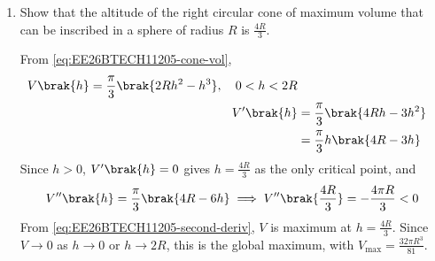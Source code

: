\begin{enumerate}[label=\thesubsection.\arabic*, ref=\thesubsection.\theenumi, itemsep=3ex]
\medskip
\solution From \eqref{eq:EE26BTECH11205-inv-prod}, $\brak{\vec{A}\vec{B}}^{-1} = \vec{B}^{-1}\vec{A}^{-1}$. Here $\mydet{\vec{B}} = 1\brak{3} - 2\brak{-1} - 2\brak{2} = 1$ and, from \eqref{eq:EE26BTECH11205-adjugate}, the matrix of cofactors is
\begin{align}
	\vec{C} &= \myvec{3 & 1 & 2 \\ 2 & 1 & 2 \\ 6 & 2 & 5} \notag
	\\
	\implies \vec{B}^{-1} &= \vec{C}^{\top} \notag
	\\
	&= \myvec{3 & 2 & 6 \\ 1 & 1 & 2 \\ 2 & 2 & 5}
\end{align}
Therefore
\begin{align}
	\brak{\vec{A}\vec{B}}^{-1} &= \myvec{3 & 2 & 6 \\ 1 & 1 & 2 \\ 2 & 2 & 5}\myvec{3 & -1 & 1 \\ -15 & 6 & -5 \\ 5 & -2 & 2} \notag
	\\
	&= \myvec{9 & -3 & 5 \\ -2 & 1 & 0 \\ 1 & 0 & 2}
\end{align}

\medskip
The following code verifies the solution
\begin{lstlisting}[frame=single, basicstyle=\rmfamily, escapeinside={(*@}{@*)}]
(*@\makebox[\dimexpr\linewidth-2\fboxsep-2\fboxrule\relax][c]{codes/Q28.py}@*)
\end{lstlisting}

\item
Show that the altitude of the right circular cone of maximum volume that can be inscribed in a sphere of radius $R$ is $\frac{4R}{3}$.

\medskip
\solution From \eqref{eq:EE26BTECH11205-cone-vol},
\begin{align}
	V\brak{h} = \frac{\pi}{3}\brak{2Rh^2 - h^3},\quad 0<h<2R
	\\
	V^{\prime}\brak{h} &= \frac{\pi}{3}\brak{4Rh - 3h^2} \notag
	\\
	&= \frac{\pi}{3}h\brak{4R-3h}
\end{align}
Since $h>0$, $V^{\prime}\brak{h} = 0$ gives $h = \frac{4R}{3}$ as the only critical point, and
\begin{align}
	V^{\prime\prime}\brak{h} = \frac{\pi}{3}\brak{4R - 6h} \implies V^{\prime\prime}\brak{\frac{4R}{3}} = -\frac{4\pi R}{3} < 0
\end{align}
From \eqref{eq:EE26BTECH11205-second-deriv}, $V$ is maximum at $h = \frac{4R}{3}$. Since $V\to0$ as $h\to0$ or $h\to2R$, this is the global maximum, with $V_{\max} = \frac{32\pi R^3}{81}$.


\end{enumerate}
